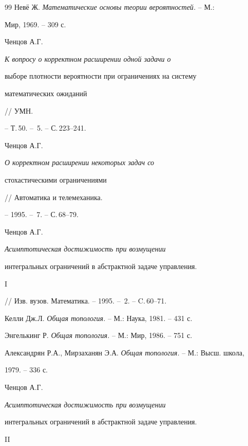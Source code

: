 \begin{thebibliography}{99}
Нев\"е Ж. {\em Математические основы теории вероятностей.} -- М.:


Мир, 1969. -- 309 с.







Ченцов А.Г. {\em К вопросу о корректном расширении одной задачи о


выборе плотности вероятности при ограничениях на систему


математических ожиданий} // УМН.


-- Т.\,50. -- \No\,5. -- С.\,223--241.







Ченцов А.Г. {\em О корректном расширении некоторых задач со


стохастическими ограничениями} // Автоматика и телемеханика.


-- 1995. -- \No\,7. -- С.\,68--79.







Ченцов А.Г. {\em Асимптотическая достижимость при возмущении


интегральных ограничений в абстрактной задаче управления.} I


// Изв. вузов. Математика. -- 1995. -- \No\,2. -- C.\,60--71.







Келли Дж.Л. {\em Общая топология.} -- М.: Наука, 1981. -- 431 с.







Энгелькинг Р. {\em Общая топология.} -- М.: Мир, 1986. -- 751 с.







Александрян Р.А., Мирзаханян Э.А. {\em Общая топология.} -- М.: Высш. школа,


1979. -- 336 с.







Ченцов А.Г. {\em Асимптотическая достижимость при возмущении


интегральных ограничений в абстрактной задаче управления.} II



\end{thebibliography}

